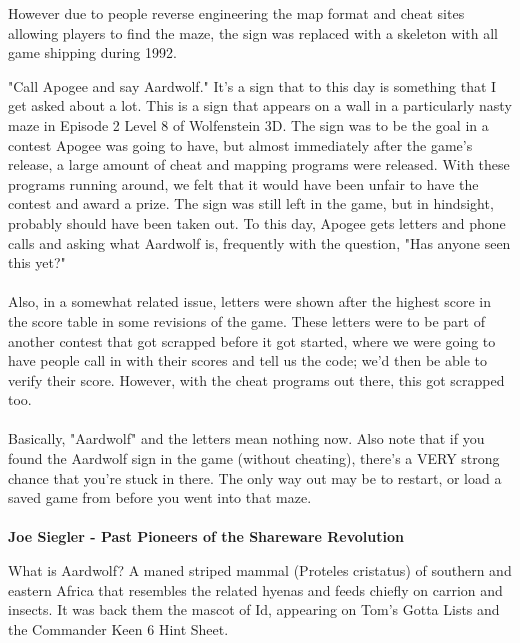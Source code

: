\begin{figure}[H]
  \centering
\end{figure}
\par
However due to people reverse engineering the map format and cheat sites allowing players to find the maze, the sign was replaced with a skeleton with all game shipping during 1992.
\par
\begin{fancyquotes}
"Call Apogee and say Aardwolf."  It's a sign that to this day is something
that I get asked about a lot.  This is a sign that appears on a wall in a
particularly nasty maze in Episode 2 Level 8 of Wolfenstein 3D.  The sign
was to be the goal in a contest Apogee was going to have, but almost
immediately after the game's release, a large amount of cheat and mapping
programs were released.  With these programs running around, we felt that
it would have been unfair to have the contest and award a prize.  The sign
was still left in the game, but in hindsight, probably should have been
taken out.  To this day, Apogee gets letters and phone calls and asking
what Aardwolf is, frequently with the question, "Has anyone seen this yet?"\\
\\
Also, in a somewhat related issue, letters were shown after the highest score
in the score table in some revisions of the game.  These letters were to be
part of another contest that got scrapped before it got started, where we were
going to have people call in with their scores and tell us the code; we'd then
be able to verify their score.  However, with the cheat programs out there,
this got scrapped too.\\
\\
Basically, "Aardwolf" and the letters mean nothing now.  Also note that if
you found the Aardwolf sign in the game (without cheating), there's a VERY
strong chance that you're stuck in there.  The only way out may be to restart,
or load a saved game from before you went into that maze.\\
\\
\textbf{Joe Siegler - Past Pioneers of the Shareware Revolution}
\end{fancyquotes}
\par
{} What is Aardwolf? A maned striped mammal (Proteles cristatus) of southern and eastern Africa that resembles the related hyenas and feeds chiefly on carrion and insects. It was back them the mascot of Id, appearing on Tom's Gotta Lists and the Commander Keen 6 Hint Sheet.














